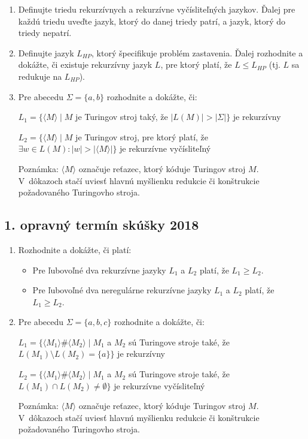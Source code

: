 \documentclass[11pt,a4paper]{article}
\begin{document}
		\begin{enumerate}
			\item Definujte triedu rekurzívnych a rekurzívne vyčísliteľných jazykov. Ďalej pre každú triedu uveďte jazyk, ktorý do danej triedy patrí, a jazyk, ktorý do triedy nepatrí.

			\item Definujte jazyk $L_{HP}$, ktorý špecifikuje problém zastavenia. Ďalej rozhodnite a dokážte, či existuje rekurzívny jazyk $L$, pre ktorý platí, že $L \leq L_{HP}$ (tj. $L$ sa redukuje na $L_{HP}$).
	
			\item Pre abecedu $\Sigma = \{a, b\}$ rozhodnite a dokážte, či:
	
			$L_1 = \{\langle M \rangle \mid M$ je Turingov stroj taký, že $\vert L(M) \vert  > \vert \Sigma \vert\}$ je rekurzívny
	
			$L_2 = \{\langle M \rangle \mid M$ je Turingov stroj, pre ktorý platí, že $\exists w \in L(M) : \vert w \vert > \vert \langle M \rangle \vert\}$ je rekurzívne vyčísliteľný
	
			Poznámka: $\langle M \rangle$ označuje reťazec, ktorý kóduje Turingov stroj $M$. V~dôkazoch stačí uviesť hlavnú myšlienku redukcie či konštrukcie požadovaného Turingovho stroja.
		\end{enumerate}	
	
		\subsection{1. opravný termín skúšky 2018}
		
		\begin{enumerate}
			\item Rozhodnite a dokážte, či platí:
			\begin{itemize}
				\item Pre ľubovoľné dva rekurzívne jazyky $L_1$ a $L_2$ platí, že $L_1 \geq L_2$.
				\item Pre ľubovoľné dva neregulárne rekurzívne jazyky $L_1$ a $L_2$ platí, že $L_1 \geq L_2$.
			\end{itemize}
		
			\item Pre abecedu $\Sigma = \{a, b, c\}$ rozhodnite a dokážte, či:
			
			$L_1 = \{\langle M_1 \rangle \# \langle M_2 \rangle \mid M_1$ a $M_2$  sú Turingove stroje také, že $L(M_1) \setminus L(M_2) = \{a\}\}$ je rekurzívny
			
			$L_2 = \{\langle M_1 \rangle \# \langle M_2 \rangle \mid M_1$ a $M_2$  sú Turingove stroje také, že $L(M_1) \cap L(M_2) \neq \emptyset\}$ je rekurzívne vyčísliteľný
			
			Poznámka: $\langle M \rangle$ označuje reťazec, ktorý kóduje Turingov stroj $M$. V~dôkazoch stačí uviesť hlavnú myšlienku redukcie či konštrukcie požadovaného Turingovho stroja.
		\end{enumerate}	
	
\end{document}
